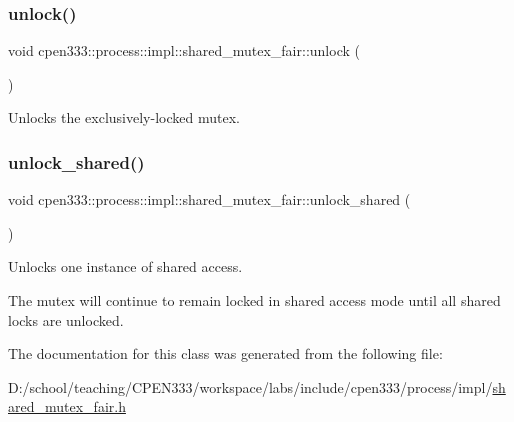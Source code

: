 \subsubsection{\texorpdfstring{unlock()}{unlock()}}
{\footnotesize\ttfamily void cpen333\+::process\+::impl\+::shared\+\_\+mutex\+\_\+fair\+::unlock (\begin{DoxyParamCaption}{ }\end{DoxyParamCaption})\hspace{0.3cm}{\ttfamily [inline]}}



Unlocks the exclusively-\/locked mutex. 

\mbox{\label{classcpen333_1_1process_1_1impl_1_1shared__mutex__fair_afa970da78252148b1ff049be3c239155}} 
\subsubsection{\texorpdfstring{unlock\+\_\+shared()}{unlock\_shared()}}
{\footnotesize\ttfamily void cpen333\+::process\+::impl\+::shared\+\_\+mutex\+\_\+fair\+::unlock\+\_\+shared (\begin{DoxyParamCaption}{ }\end{DoxyParamCaption})\hspace{0.3cm}{\ttfamily [inline]}}



Unlocks one instance of shared access. 

The mutex will continue to remain locked in shared access mode until all shared locks are unlocked. 

The documentation for this class was generated from the following file\+:\begin{DoxyCompactItemize}
\item 
D\+:/school/teaching/\+C\+P\+E\+N333/workspace/labs/include/cpen333/process/impl/\hyperlink{shared__mutex__fair_8h}{shared\+\_\+mutex\+\_\+fair.\+h}\end{DoxyCompactItemize}
